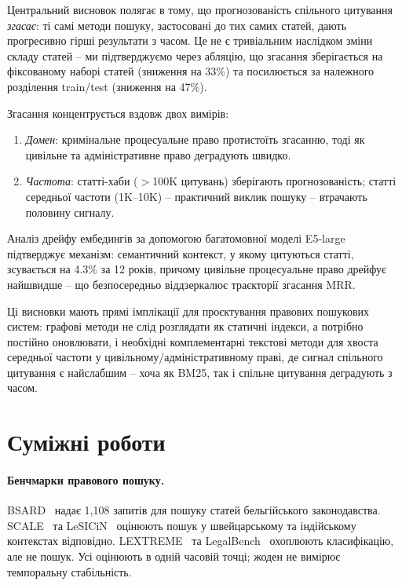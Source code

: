 Центральний висновок полягає в тому, що прогнозованість спільного цитування \emph{згасає}: ті самі методи пошуку, застосовані до тих самих статей, дають прогресивно гірші результати з часом.
Це не є тривіальним наслідком зміни складу статей – ми підтверджуємо через абляцію, що згасання зберігається на фіксованому наборі статей (зниження на 33\%) та посилюється за належного розділення train/test (зниження на 47\%).

Згасання концентрується вздовж двох вимірів:
\begin{enumerate}[nosep,leftmargin=*]
  \item \emph{Домен}: кримінальне процесуальне право протистоїть згасанню, тоді як цивільне та адміністративне право деградують швидко.
  \item \emph{Частота}: статті-хаби ($>$100K цитувань) зберігають прогнозованість; статті середньої частоти (1K–10K) – практичний виклик пошуку – втрачають половину сигналу.
\end{enumerate}

Аналіз дрейфу ембедингів за допомогою багатомовної моделі E5-large підтверджує механізм: семантичний контекст, у якому цитуються статті, зсувається на 4.3\% за 12 років, причому цивільне процесуальне право дрейфує найшвидше – що безпосередньо віддзеркалює траєкторії згасання MRR.

Ці висновки мають прямі імплікації для проєктування правових пошукових систем: графові методи не слід розглядати як статичні індекси, а потрібно постійно оновлювати, і необхідні комплементарні текстові методи для хвоста середньої частоти у цивільному/адміністративному праві, де сигнал спільного цитування є найслабшим – хоча як BM25, так і спільне цитування деградують з часом.

\section{Суміжні роботи}
\label{sec:related}

\paragraph{Бенчмарки правового пошуку.}
BSARD~\citep{lotfi2024bsard} надає 1{,}108 запитів для пошуку статей бельгійського законодавства.
SCALE~\citep{rasiah2023scale} та LeSICiN~\citep{paul2021lesicin} оцінюють пошук у швейцарському та індійському контекстах відповідно.
LEXTREME~\citep{niklaus2023lextreme} та LegalBench~\citep{guha2023legalbench} охоплюють класифікацію, але не пошук.
Усі оцінюють в одній часовій точці; жоден не вимірює темпоральну стабільність.

